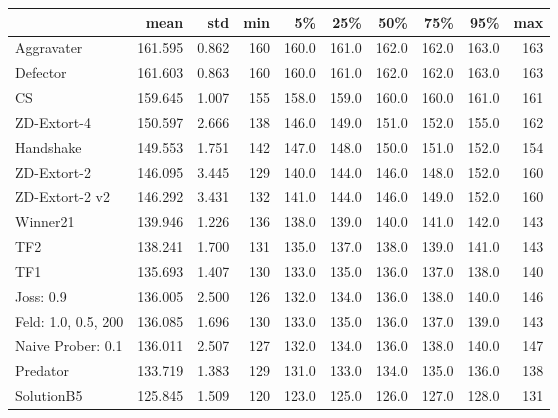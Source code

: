 \begin{tabular}{lrrrrrrrrr}
\toprule
{} &     mean &    std &  min &     5\% &    25\% &    50\% &    75\% &    95\% &  max \\
\midrule
Aggravater          &  161.595 &  0.862 &  160 &  160.0 &  161.0 &  162.0 &  162.0 &  163.0 &  163 \\
Defector            &  161.603 &  0.863 &  160 &  160.0 &  161.0 &  162.0 &  162.0 &  163.0 &  163 \\
CS                  &  159.645 &  1.007 &  155 &  158.0 &  159.0 &  160.0 &  160.0 &  161.0 &  161 \\
ZD-Extort-4         &  150.597 &  2.666 &  138 &  146.0 &  149.0 &  151.0 &  152.0 &  155.0 &  162 \\
Handshake           &  149.553 &  1.751 &  142 &  147.0 &  148.0 &  150.0 &  151.0 &  152.0 &  154 \\
ZD-Extort-2         &  146.095 &  3.445 &  129 &  140.0 &  144.0 &  146.0 &  148.0 &  152.0 &  160 \\
ZD-Extort-2 v2      &  146.292 &  3.431 &  132 &  141.0 &  144.0 &  146.0 &  149.0 &  152.0 &  160 \\
Winner21            &  139.946 &  1.226 &  136 &  138.0 &  139.0 &  140.0 &  141.0 &  142.0 &  143 \\
TF2                 &  138.241 &  1.700 &  131 &  135.0 &  137.0 &  138.0 &  139.0 &  141.0 &  143 \\
TF1                 &  135.693 &  1.407 &  130 &  133.0 &  135.0 &  136.0 &  137.0 &  138.0 &  140 \\
Joss: 0.9           &  136.005 &  2.500 &  126 &  132.0 &  134.0 &  136.0 &  138.0 &  140.0 &  146 \\
Feld: 1.0, 0.5, 200 &  136.085 &  1.696 &  130 &  133.0 &  135.0 &  136.0 &  137.0 &  139.0 &  143 \\
Naive Prober: 0.1   &  136.011 &  2.507 &  127 &  132.0 &  134.0 &  136.0 &  138.0 &  140.0 &  147 \\
Predator            &  133.719 &  1.383 &  129 &  131.0 &  133.0 &  134.0 &  135.0 &  136.0 &  138 \\
SolutionB5          &  125.845 &  1.509 &  120 &  123.0 &  125.0 &  126.0 &  127.0 &  128.0 &  131 \\
\bottomrule
\end{tabular}
